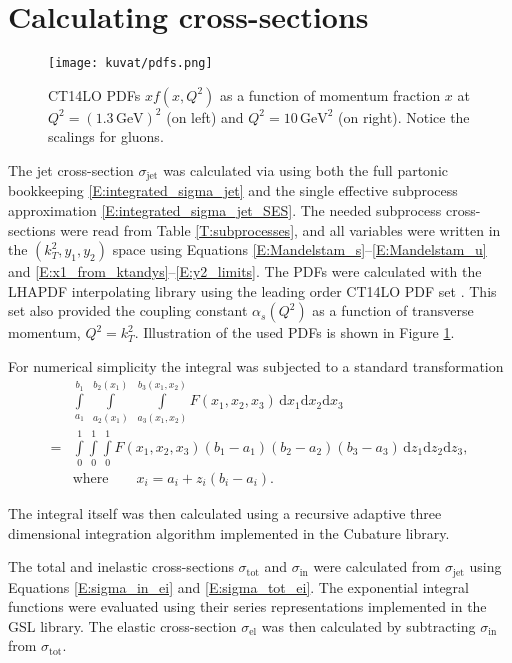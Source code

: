 \documentclass[a4paper, twoside, english, 12pt]{report}
\begin{document}
\section{Calculating cross-sections}\label{SS:numerical_sigma_jet}

\begin{figure}[b!]
	\centering
	\texttt{[image: kuvat/pdfs.png]}
	\caption{CT14LO \cite{ct14lo} PDFs $xf(x,Q^2)$ as a function of momentum fraction $x$ at $Q^2 = (1.3\,\text{GeV})^2$ (on left) and $Q^2 = 10\,\text{GeV}^2$ (on right). Notice the scalings for gluons.}
	\label{F:pdfs}
\end{figure}

The jet cross-section $\sigma_{\text{jet}}$ was calculated via using both the full partonic bookkeeping \eqref{E:integrated_sigma_jet} and the single effective subprocess approximation \eqref{E:integrated_sigma_jet_SES}. The needed subprocess cross-sections were read from Table \ref{T:subprocesses}, and all variables were written in the $(k_T^2,y_1,y_2)$ space using Equations \eqref{E:Mandelstam_s}--\eqref{E:Mandelstam_u} and \eqref{E:x1_from_ktandys}--\eqref{E:y2_limits}. The PDFs were calculated with the LHAPDF \cite{LHAPDF} interpolating library using the leading order CT14LO PDF set \cite{ct14lo}. This set also provided the coupling constant $\alpha_s(Q^2)$ as a function of transverse momentum, $Q^2=k_T^2$. Illustration of the used PDFs is shown in Figure \ref{F:pdfs}.

For numerical simplicity the integral was subjected to a standard transformation
\begin{align}\label{E:integrand_scaling}
	&\int\limits_{a_1}^{b_1} \; \int\limits_{a_2(x_1)}^{b_2(x_1)} \; \int\limits_{a_3(x_1,x_2)}^{b_3(x_1,x_2)} F(x_1,x_2,x_3)\, \text{d}x_1\text{d}x_2\text{d}x_3 \nonumber \\[1em]
	= &\int\limits_{0}^{1}\int\limits_{0}^{1}\int\limits_{0}^{1} F(x_1,x_2,x_3) (b_1-a_1)(b_2-a_2)(b_3-a_3) \, \text{d}z_1\text{d}z_2\text{d}z_3 , \\[1em]
	&\text{where}\qquad x_i = a_i + z_i(b_i-a_i).\nonumber
\end{align}

The integral itself was then calculated using a recursive adaptive three dimensional integration algorithm implemented in the Cubature \cite{cubature} library.

The total and inelastic cross-sections $\sigma_{\text{tot}}$ and $\sigma_{\text{in}}$ were calculated from $\sigma_{\text{jet}}$ using Equations \eqref{E:sigma_in_ei} and \eqref{E:sigma_tot_ei}. The exponential integral functions were evaluated using their series representations implemented in the GSL \cite{gsl} library. The elastic cross-section $\sigma_{\text{el}}$ was then calculated by subtracting $\sigma_{\text{in}}$ from $\sigma_{\text{tot}}$.
\end{document}
